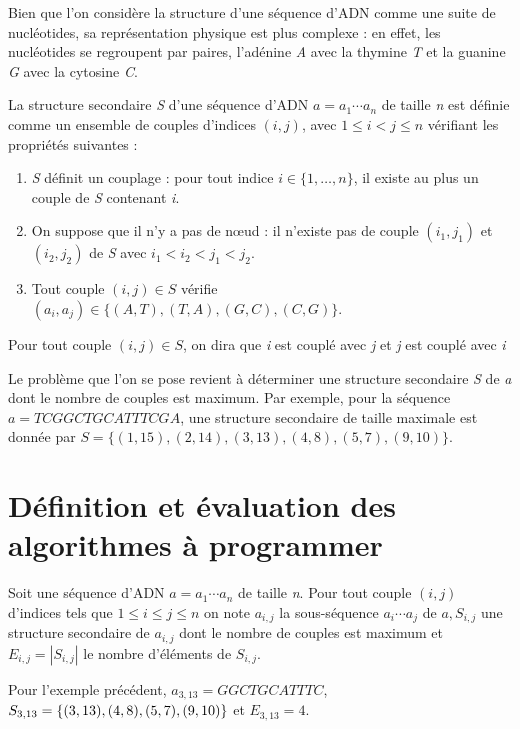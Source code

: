 \documentclass[12pt,a4paper]{article}
\begin{document}
Bien que l'on consid\`ere la structure d'une s\'equence d'ADN comme une suite de nucl\'eotides, sa repr\'esentation physique est plus complexe : en effet, les nucl\'eotides se regroupent par paires, l'ad\'enine {\itshape A} avec la thymine {\itshape T} et la guanine {\itshape G} avec la cytosine {\itshape C}.

La structure secondaire {\itshape S} d'une s\'equence d'ADN \( a = a_1 \dotsm a_n \) de taille {\itshape n} est d\'efinie comme un ensemble de couples d'indices \( (i,j) \), avec \( 1 \leq i < j \leq n\) v\'erifiant les propri\'et\'es suivantes :
\begin{enumerate}
	\item {\itshape S} d\'efinit un couplage : pour tout indice \( i \in \{1,\dotsc,n\} \), il existe au plus un couple de {\itshape S} contenant {\itshape i}.
	\item On suppose que il n'y a pas de n\oe ud : il n'existe pas de couple \( (i_1,j_1) \) et \( (i_2,j_2) \) de {\itshape S} avec \( i_1 < i_2 < j_1 < j_2 \).
	\item Tout couple \( (i,j) \in S \) v\'erifie \( (a_i,a_j) \in \{(A,T),(T,A),(G,C),(C,G)\}\).
\end{enumerate}
Pour tout couple \( (i,j) \in S \), on dira que {\itshape i} est coupl\'e avec {\itshape j} et {\itshape j} est coupl\'e avec {\itshape i}

Le probl\`eme que l'on se pose revient \`a d\'eterminer une structure secondaire {\itshape S} de {\itshape a} dont le nombre de couples est maximum. Par exemple, pour la s\'equence \( a = TCGGCTGCATTTCGA \), une structure secondaire de taille maximale est donn\'ee par \( S = \{(1,15),(2,14),(3,13),(4,8),(5,7),(9,10)\} \).

\newpage
\section{D\'efinition et \'evaluation des algorithmes \`a programmer}

Soit une s\'equence d'ADN \( a = a_1 \dotsm a_n \) de taille {\itshape n}. Pour tout couple \( (i,j) \) d'indices tels que \( 1 \leq i \leq j \leq n\) on note \( a_{i,j} \) la sous-s\'equence \( a_i \dotsm a_j \) de \( a, S_{i,j} \) une structure secondaire de \( a_{i,j} \) dont le nombre de couples est maximum et \( E_{i,j} =  |S_{i,j}| \) le nombre d'\'el\'ements de \( S_{i,j} \).

Pour l'exemple pr\'ec\'edent, \( a_{3,13} = GGCTGCATTTC \), \( S_{3,13} = \{(3,13),(4,8),\\(5,7),(9,10)\} \) et \( E_{3,13} = 4 \).
\end{document}

